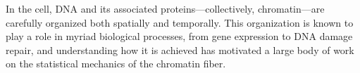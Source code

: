 \documentclass[%
 reprint,
superscriptaddress,
showpacs,preprintnumbers,
 amsmath,amssymb,
 aps,
 prl,
]{revtex4-1}
\begin{document}


In the cell, DNA and its associated proteins---collectively, chromatin---are
    carefully organized both spatially and temporally.
This organization is known to play a role in myriad biological processes,
    from gene expression to DNA damage repair, and understanding how it is
    achieved has motivated a large body of work on the statistical mechanics of
    the chromatin fiber.
\end{document}
